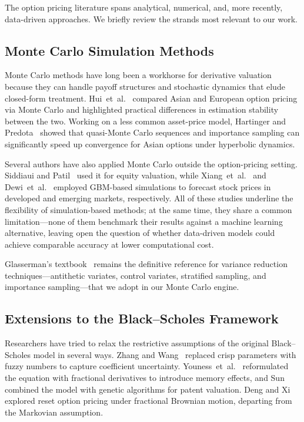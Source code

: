 \documentclass[conference]{IEEEtran}
\begin{document}
The option pricing literature spans analytical, numerical, and, more recently, data-driven approaches. We briefly review the strands most relevant to our work.

\subsection{Monte Carlo Simulation Methods}

Monte Carlo methods have long been a workhorse for derivative valuation because they can handle payoff structures and stochastic dynamics that elude closed-form treatment. Hui~et~al.~\cite{b7} compared Asian and European option pricing via Monte Carlo and highlighted practical differences in estimation stability between the two. Working on a less common asset-price model, Hartinger and Predota~\cite{b8} showed that quasi-Monte Carlo sequences and importance sampling can significantly speed up convergence for Asian options under hyperbolic dynamics.

Several authors have also applied Monte Carlo outside the option-pricing setting. Siddiaui and Patil~\cite{b9} used it for equity valuation, while Xiang~et~al.~\cite{b10} and Dewi~et~al.~\cite{b11} employed GBM-based simulations to forecast stock prices in developed and emerging markets, respectively. All of these studies underline the flexibility of simulation-based methods; at the same time, they share a common limitation---none of them benchmark their results against a machine learning alternative, leaving open the question of whether data-driven models could achieve comparable accuracy at lower computational cost.

Glasserman's textbook~\cite{b4} remains the definitive reference for variance reduction techniques---antithetic variates, control variates, stratified sampling, and importance sampling---that we adopt in our Monte Carlo engine.

\subsection{Extensions to the Black--Scholes Framework}

Researchers have tried to relax the restrictive assumptions of the original Black--Scholes model in several ways. Zhang and Wang~\cite{b12} replaced crisp parameters with fuzzy numbers to capture coefficient uncertainty. Youness~et~al.~\cite{b13} reformulated the equation with fractional derivatives to introduce memory effects, and Sun~\cite{b14} combined the model with genetic algorithms for patent valuation. Deng and Xi~\cite{b16} explored reset option pricing under fractional Brownian motion, departing from the Markovian assumption.
\end{document}
